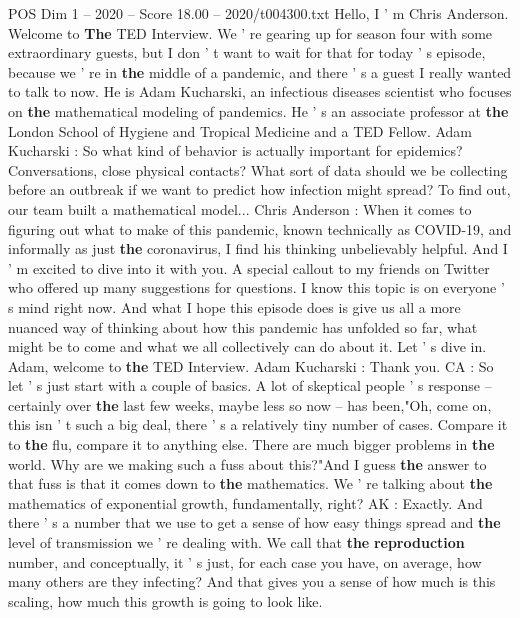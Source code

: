 \begin{textsample}{POS Dim 1 – 2020 – Score 18.00 – 2020/t004300.txt}  \label{ex:f1_pos_074}
Hello, I ' m Chris Anderson.
Welcome to \textbf{The} TED Interview.
We ' re gearing up for season four with some extraordinary guests, but I don ' t want to wait for that for today ' s episode, because we ' re in \textbf{the} middle of a pandemic, and there ' s a guest I really wanted to talk to now.
He is Adam Kucharski, an infectious diseases scientist who focuses on \textbf{the} mathematical modeling of pandemics.
He ' s an associate professor at \textbf{the} London School of Hygiene and Tropical Medicine and a TED Fellow.
Adam Kucharski : So what kind of behavior is actually important for epidemics?
Conversations, close physical contacts?
What sort of data should we be collecting before an outbreak if we want to predict how infection might spread?
To find out, our team built a mathematical model...
Chris Anderson : When it comes to figuring out what to make of this pandemic, known technically as COVID-19, and informally as just \textbf{the} coronavirus, I find his thinking unbelievably helpful.
And I ' m excited to dive into it with you.
A special callout to my friends on Twitter who offered up many suggestions for questions.
I know this topic is on everyone ' s mind right now.
And what I hope this episode does is give us all a more nuanced way of thinking about how this pandemic has unfolded so far, what might be to come and what we all collectively can do about it.
Let ' s dive in.
Adam, welcome to \textbf{the} TED Interview.
Adam Kucharski : Thank you.
CA : So let ' s just start with a couple of basics.
A lot of skeptical people ' s response -- certainly over \textbf{the} last few weeks, maybe less so now -- has been,"Oh, come on, this isn ' t such a big deal, there ' s a relatively tiny number of cases.
Compare it to \textbf{the} flu, compare it to anything else.
There are much bigger problems in \textbf{the} world.
Why are we making such a fuss about this?"And I guess \textbf{the} answer to that fuss is that it comes down to \textbf{the} mathematics.
We ' re talking about \textbf{the} mathematics of exponential growth, fundamentally, right?
AK : Exactly.
And there ' s a number that we use to get a sense of how easy things spread and \textbf{the} level of transmission we ' re dealing with.
We call that \textbf{the} \textbf{reproduction} number, and conceptually, it ' s just, for each case you have, on average, how many others are they infecting?
And that gives you a sense of how much is this scaling, how much this growth is going to look like.

\end{textsample}
